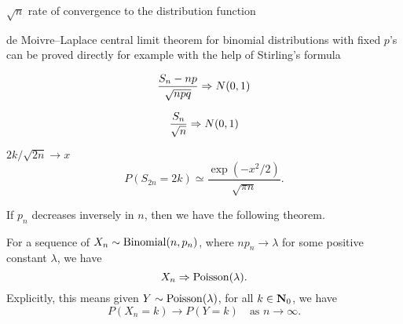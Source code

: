 $\sqrt{n}$ rate of convergence to the distribution function

de Moivre--Laplace central limit theorem for binomial distributions with fixed $p$'s can be proved directly for example with the help of Stirling's formula

\begin{thm}
    \[
        \frac{S_n - np}{\sqrt{n pq}} \Rightarrow N(0,1)
    \]

    \[
        \frac{S_n}{\sqrt{n}} \Rightarrow N(0,1)
    \]

    \cite[Theorem~3.12]{Durrett_2019} $2k/\sqrt{2n} \to x$
    \[
        P(S_{2n} = 2k) \simeq \frac{\exp(-x^2 / 2)}{\sqrt{\pi n}}.
    \]
\end{thm}

If $p_n$ decreases inversely in $n$, then we have the following theorem.

\begin{namedthm}
    For a sequence of $X_n \sim \operatorname{Binomial}(n,p_n)$, where $n p_n \to \lambda$ for some positive constant $\lambda$, we have \[
        X_n \Rightarrow \operatorname{Poisson}(\lambda).
    \] Explicitly, this means given $Y \sim \operatorname{Poisson}(\lambda)$, for all $k \in \mathbf{N}_0$, we have \[
        P(X_n = k) \to P(Y = k)\quad \text{as } n \to \infty.
    \]
\end{namedthm}